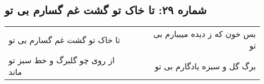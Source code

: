 \begin{center}
\section*{شماره ۲۹: تا خاک تو گشت غم گسارم بی تو}
\label{sec:029}
\begin{longtable}{l p{0.5cm} r}
تا خاک تو گشت غم گسارم بی تو
&&
بس خون که ز دیده میببارم بی تو
\\
از روی چو گلبرگ و خط سبز تو ماند
&&
برگ گل و سبزه یادگارم بی تو
\\
\end{longtable}
\end{center}
